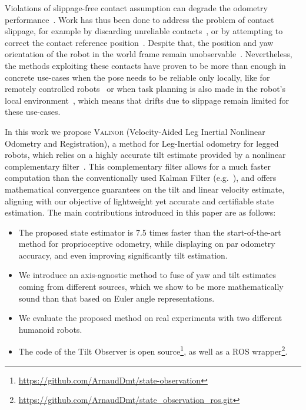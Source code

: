 \documentclass{IJCAS}
\begin{document}
 Violations of slippage-free contact assumption can degrade the odometry performance~\cite{lin2021legged, maravgakis2023probabilistic}. Work has thus been done to address the problem of contact slippage, for example by discarding unreliable contacts~\cite{lin2021legged, maravgakis2023probabilistic,yoon2023InvariantSmootherDynamicContactEventInformation}, or by attempting to correct the contact reference position~\cite{bloesch2013FusionLegKineAndImu,Hartley2020RIEKF, Demont2024KineticsObserver}. Despite that, the position and yaw orientation of the robot in the world frame remain unobservable~\cite{bloesch2013FusionLegKineAndImu}. Nevertheless, the methods exploiting these contacts have proven to be more than enough in concrete use-cases when the pose needs to be reliable only locally, like for remotely controlled robots~\cite{Grandia2024DesignControlBipedalRoboticCharacter} or when task planning is also made in the robot's local environment~\cite{Tsuru2023OnlineMulticontactReplanningHumanoid}, which means that drifts due to slippage remain limited for these use-cases.

In this work we propose {\scshape Valinor} (Velocity-Aided Leg Inertial Nonlinear Odometry and Registration), a method for Leg-Inertial odometry for legged robots, which relies on a highly accurate tilt estimate provided by a nonlinear complementary filter~\cite{benallegue2020LyapunovStableOrientationEstimatorHumanoids}. This complementary filter allows for a much faster computation than the conventionally used Kalman Filter (e.g.~\cite{Hartley2020RIEKF}), and offers mathematical convergence guarantees on the tilt and linear velocity estimate, aligning with our objective of lightweight yet accurate and certifiable state estimation.
The main contributions introduced in this paper are as follows:
\begin{itemize}
  \item The proposed state estimator is 7.5 times faster than the start-of-the-art method for proprioceptive odometry, while displaying on par odometry accuracy, and even improving significantly tilt estimation.
  \item We introduce an axis-agnostic method to fuse of yaw and tilt estimates coming from different sources, which we show to be more mathematically sound than that based on Euler angle representations.
  \item We evaluate the proposed method on real experiments with two different humanoid robots.
  \item The code of the Tilt Observer is open source\footnote{\scriptsize \url{https://github.com/ArnaudDmt/state-observation}}, as well as a ROS wrapper\footnote{\scriptsize \url{https://github.com/ArnaudDmt/state_observation_ros.git}}.
\end{itemize}
\end{document}
